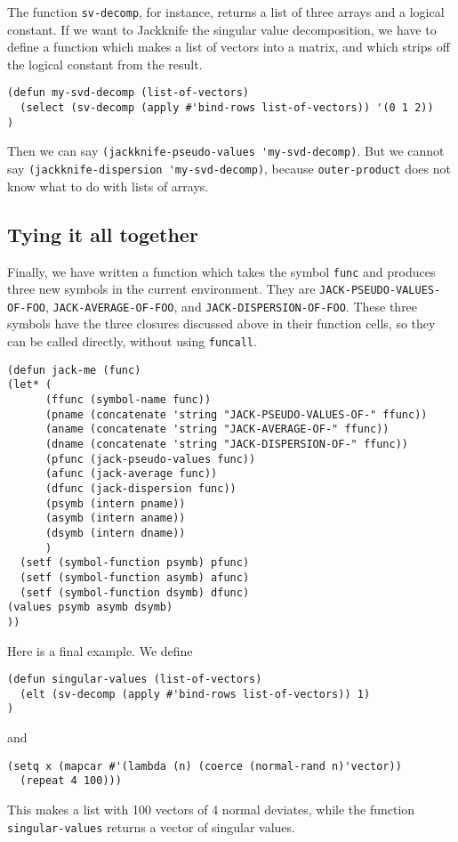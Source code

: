 \documentclass{amsart}
\theoremstyle{definition}
\theoremstyle{remark}
\numberwithin{equation}{section}
\begin{document}
%
The function \texttt{sv-decomp}, for instance, returns a list of
three arrays and a logical constant. If we want to Jackknife the
singular value decomposition, we have to define a function which
makes a list of vectors into a matrix, and which strips off the
logical constant from the result. 
%
\begin{verbatim}
(defun my-svd-decomp (list-of-vectors)
  (select (sv-decomp (apply #'bind-rows list-of-vectors)) '(0 1 2))
)
\end{verbatim}
%
Then we can say \verb+(jackknife-pseudo-values 'my-svd-decomp)+.
But we cannot say \verb+(jackknife-dispersion 'my-svd-decomp)+,
because \texttt{outer-product} does not know what to do with
lists of arrays.
%
\subsection{Tying it all together}
%
Finally, we have written a function which takes the symbol \texttt{func}
and produces three new symbols in the current environment. They are
\texttt{JACK-PSEUDO-VALUES-OF-FOO}, \texttt{JACK-AVERAGE-OF-FOO}, and 
\texttt{JACK-DISPERSION-OF-FOO}. These three symbols have the 
three closures discussed above in their function cells, so they can
be called directly, without using \texttt{funcall}.
%
\begin{verbatim}
(defun jack-me (func)
(let* (
      (ffunc (symbol-name func))
      (pname (concatenate 'string "JACK-PSEUDO-VALUES-OF-" ffunc))
      (aname (concatenate 'string "JACK-AVERAGE-OF-" ffunc))
      (dname (concatenate 'string "JACK-DISPERSION-OF-" ffunc))
      (pfunc (jack-pseudo-values func))
      (afunc (jack-average func))
      (dfunc (jack-dispersion func))
      (psymb (intern pname))
      (asymb (intern aname))
      (dsymb (intern dname))
      )
  (setf (symbol-function psymb) pfunc)
  (setf (symbol-function asymb) afunc)
  (setf (symbol-function dsymb) dfunc)
(values psymb asymb dsymb)
))
\end{verbatim}
%
Here is a final example. We define
\begin{verbatim}
(defun singular-values (list-of-vectors)
  (elt (sv-decomp (apply #'bind-rows list-of-vectors)) 1)
)
\end{verbatim}
and
\begin{verbatim}
(setq x (mapcar #'(lambda (n) (coerce (normal-rand n)'vector))
  (repeat 4 100)))
\end{verbatim}
This makes a list with 100 vectors of 4 normal deviates, while 
the function \texttt{singular-values} returns a vector of singular values.
\end{document}
